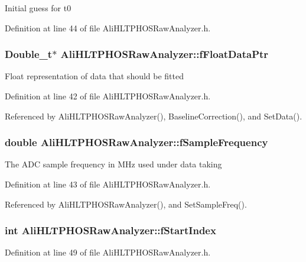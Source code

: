 Initial guess for t0 

Definition at line 44 of file Ali\-HLTPHOSRaw\-Analyzer.h.
\subsubsection{\setlength{\rightskip}{0pt plus 5cm}Double\_\-t$\ast$ {\bf Ali\-HLTPHOSRaw\-Analyzer::f\-Float\-Data\-Ptr}\hspace{0.3cm}{\tt  [protected]}}\label{classAliHLTPHOSRawAnalyzer_p0}


Float representation of data that should be fitted 

Definition at line 42 of file Ali\-HLTPHOSRaw\-Analyzer.h.

Referenced by Ali\-HLTPHOSRaw\-Analyzer(), Baseline\-Correction(), and Set\-Data().
\subsubsection{\setlength{\rightskip}{0pt plus 5cm}double {\bf Ali\-HLTPHOSRaw\-Analyzer::f\-Sample\-Frequency}\hspace{0.3cm}{\tt  [protected]}}\label{classAliHLTPHOSRawAnalyzer_p1}


The ADC sample frequency in MHz used under data taking 

Definition at line 43 of file Ali\-HLTPHOSRaw\-Analyzer.h.

Referenced by Ali\-HLTPHOSRaw\-Analyzer(), and Set\-Sample\-Freq().
\subsubsection{\setlength{\rightskip}{0pt plus 5cm}int {\bf Ali\-HLTPHOSRaw\-Analyzer::f\-Start\-Index}\hspace{0.3cm}{\tt  [protected]}}\label{classAliHLTPHOSRawAnalyzer_p7}




Definition at line 49 of file Ali\-HLTPHOSRaw\-Analyzer.h.

